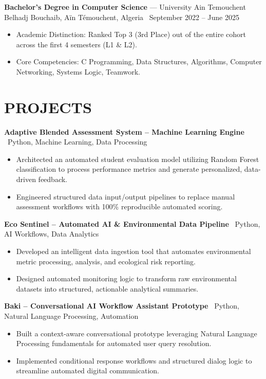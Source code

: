 \documentclass[10.5pt, letterpaper]{article}
\newcommand{\entry}[4]{%
  \noindent\textbf{#1} --- #3, #4 \textbar\ #2\par
  \vspace{2pt}
}
\newcommand{\projectentry}[2]{%
  \noindent\textbf{#1} \textbar\ #2\par
  \vspace{2pt}
}
\newcommand{\resumeItem}[1]{\item #1}
\begin{document}
\entry{Bachelor's Degree in Computer Science}{September 2022 -- June 2025}{University Ain Temouchent Belhadj Bouchaib}{Aïn Témouchent, Algeria}
\begin{itemize}
  \resumeItem{Academic Distinction: Ranked Top 3 (3rd Place) out of the entire cohort across the first 4 semesters (L1 \& L2).}
  \resumeItem{Core Competencies: C Programming, Data Structures, Algorithms, Computer Networking, Systems Logic, Teamwork.}
\end{itemize}

\section{PROJECTS}

\projectentry{Adaptive Blended Assessment System -- Machine Learning Engine}{Python, Machine Learning, Data Processing}
\begin{itemize}
  \resumeItem{Architected an automated student evaluation model utilizing Random Forest classification to process performance metrics and generate personalized, data-driven feedback.}
  \resumeItem{Engineered structured data input/output pipelines to replace manual assessment workflows with 100\% reproducible automated scoring.}
\end{itemize}

\projectentry{Eco Sentinel -- Automated AI \& Environmental Data Pipeline}{Python, AI Workflows, Data Analytics}
\begin{itemize}
  \resumeItem{Developed an intelligent data ingestion tool that automates environmental metric processing, analysis, and ecological risk reporting.}
  \resumeItem{Designed automated monitoring logic to transform raw environmental datasets into structured, actionable analytical summaries.}
\end{itemize}

\projectentry{Baki -- Conversational AI Workflow Assistant Prototype}{Python, Natural Language Processing, Automation}
\begin{itemize}
  \resumeItem{Built a context-aware conversational prototype leveraging Natural Language Processing fundamentals for automated user query resolution.}
  \resumeItem{Implemented conditional response workflows and structured dialog logic to streamline automated digital communication.}
\end{itemize}
\end{document}
